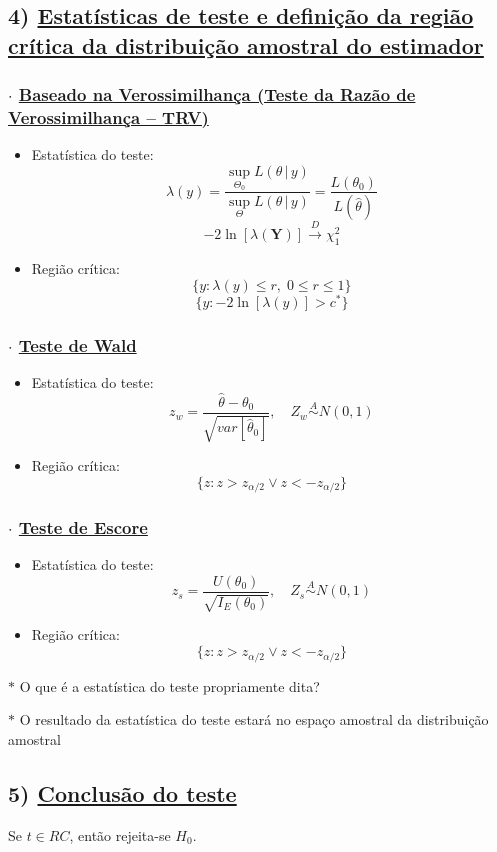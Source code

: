 \documentclass[11pt,a4paper]{article}
\begin{document}
\subsection*{4) \underline{Estatísticas de teste e definição da região crítica da distribuição amostral do estimador}}

\subsubsection*{$\cdot$ \underline{Baseado na Verossimilhança (Teste da Razão de Verossimilhança -- TRV)}}
\begin{itemize}
  \item Estatística do teste:
  \[ \lambda(y) = \frac{\sup_{\Theta_0} L(\theta\,|\,y)}{\sup_{\Theta} L(\theta\,|\,y)} = \frac{L(\theta_0)}{L(\hat{\theta})} \]
  \[ -2\ln[\lambda(\mathbf{Y})] \xrightarrow{\;D\;} \chi^2_1 \]
  \item Região crítica:
  \[ \{y : \lambda(y)\leq r,\; 0\leq r\leq 1\} \]
  \[ \{y : -2\ln[\lambda(y)] > c^*\} \]
\end{itemize}

\subsubsection*{$\cdot$ \underline{Teste de Wald}}
\begin{itemize}
  \item Estatística do teste:
  \[ z_w = \frac{\hat{\theta}-\theta_0}{\sqrt{var[\hat{\theta}_0]}}, \quad Z_w \overset{A}{\sim} N(0,1) \]
  \item Região crítica:
  \[ \{z : z > z_{\alpha/2} \vee z < -z_{\alpha/2}\} \]
\end{itemize}

\subsubsection*{$\cdot$ \underline{Teste de Escore}}
\begin{itemize}
  \item Estatística do teste:
  \[ z_s = \frac{U(\theta_0)}{\sqrt{I_E(\theta_0)}}, \quad Z_s \overset{A}{\sim} N(0,1) \]
  \item Região crítica:
  \[ \{z : z > z_{\alpha/2} \vee z < -z_{\alpha/2}\} \]
\end{itemize}

\medskip
$\ast$ O que é a estatística do teste propriamente dita?

$\ast$ O resultado da estatística do teste estará no espaço amostral da distribuição amostral

\subsection*{5) \underline{Conclusão do teste}}
Se $t\in RC$, então rejeita-se $H_0$.
\end{document}
